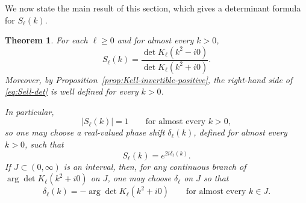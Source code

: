 \documentclass[a4paper,11pt]{article}
\numberwithin{equation}{section}
\newtheorem{thm}{Theorem}[section]
\theoremstyle{definition}
\theoremstyle{remark}
\begin{document}
We now state the main result of this section, which gives a determinant
formula for $S_\ell(k)$.

\begin{thm}
\label{thm:Sell}
For each $\ell\ge0$ and for almost every $k>0$,
\begin{equation}\label{eq:Sell-det}
S_\ell(k)
=
\frac{\det K_\ell(k^2-i0)}{\det K_\ell(k^2+i0)}.
\end{equation}
Moreover, by Proposition~\ref{prop:Kell-invertible-positive}, the
right-hand side of \eqref{eq:Sell-det} is well defined for every $k>0$.

In particular,
\[
|S_\ell(k)|=1
\qquad \text{for almost every }k>0,
\]
so one may choose a real-valued phase shift $\delta_\ell(k)$, defined for
almost every $k>0$, such that
\[
S_\ell(k)=e^{2i\delta_\ell(k)}.
\]
If $J\subset(0,\infty)$ is an interval, then, for any continuous branch of
$\arg \det K_\ell(k^2+i0)$ on $J$, one may choose $\delta_\ell$ on $J$ so that
\begin{equation}\label{eq:delta-arg}
\delta_\ell(k)
=
-\arg \det K_\ell(k^2+i0)
\qquad \text{for almost every }k\in J.
\end{equation}
\end{thm}
\end{document}
